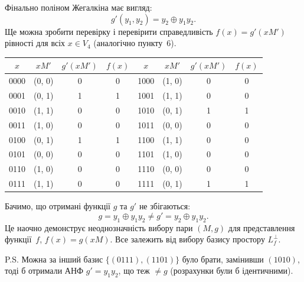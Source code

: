 Фінально поліном Жегалкіна має вигляд:
\begin{equation*}
    g'(y_{1}, y_{2}) = y_{2} \oplus y_{1} y_{2}.
\end{equation*}
Ще можна зробити перевірку і перевірити справедливість $f(x) = g'(xM')$ рівності для всіх $x \in V_{4}$ (аналогічно пункту~6).
\begin{center}
    \renewcommand{\arraystretch}{1.1}
    \begin{tabular}{c|c|c|c||c|c|c|c}
        $x$  & $xM'$  & $g'(xM')$ & $f(x)$ & $x$  & $xM'$  & $g'(xM')$ & $f(x)$ \\
        \hline
        0000 & (0, 0) & 0         & 0      & 1000 & (1, 0) & 0         & 0      \\
        0001 & (0, 1) & 1         & 1      & 1001 & (1, 1) & 0         & 0      \\
        0010 & (1, 1) & 0         & 0      & 1010 & (0, 1) & 1         & 1      \\
        0011 & (1, 0) & 0         & 0      & 1011 & (0, 0) & 0         & 0      \\
        0100 & (0, 1) & 1         & 1      & 1100 & (1, 1) & 0         & 0      \\
        0101 & (0, 0) & 0         & 0      & 1101 & (1, 0) & 0         & 0      \\
        0110 & (1, 0) & 0         & 0      & 1110 & (0, 0) & 0         & 0      \\
        0111 & (1, 1) & 0         & 0      & 1111 & (0, 1) & 1         & 1      \\
    \end{tabular}
\end{center}
Бачимо, що отримані функції $g$ та $g'$ не збігаються:
\begin{equation*}
    g = y_{1} \oplus y_{1} y_{2} \neq g' = y_{2} \oplus y_{1} y_{2}.
\end{equation*}
Це наочно демонструє неоднозначність вибору пари $(M, g)$ для представлення функції~$f$, $f(x) = g(xM)$. Все 
залежить від вибору базису простору $L_{f}^{\perp}$.

P.S. Можна за інший базис $\{(0111),(1101)\}$ було брати, замінивши $(1010)$, тоді б отримали АНФ $g' = y_{1}y_{2}$, 
що теж $\neq g$ (розрахунки були б ідентичними).

